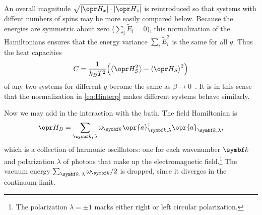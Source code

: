 \documentclass[../thesis.tex]{subfiles}
\begin{document}
An overall magnitude $\sqrt{\abs{\ham_x}\cdot\abs{\ham_z}}$ is reintroduced so
that systems with diffent numbers of spins may be more easily compared below.
Because the energies are symmetric about zero ($\sum_i \tilde{E}_i = 0$), this
normalization of the Hamiltonians ensures that the energy variance $\sum_i
\tilde{E}_i^2$ is the same for all $g$. Thus the heat capacities
\begin{equation}
  C
  = \frac{1}{k_B T^2}\qty(\ev{\ham_S^2} - \ev{\ham_S}^2)
\end{equation}
of any two systems for different $g$ become the same as $\beta \to
0$~\cite[p.~112]{kardarStatisticalPhysicsParticles2007}. It is in this sense
that the normalization in \cref{eq:Hinterp} makes different systems behave
similarly.

Now we may add in the interaction with the bath. The field Hamiltonian is
\begin{equation}
  \ham_B
  = \sum_{\vq{k},\, \lambda} \omega_{\vq{k}}
  \opr{a}^\dag_{\vq{k},\lambda}\opr{a}_{\vq{k},\lambda},
  \label{eq:bath-hamiltonian}
\end{equation}
which is a collection of harmonic oscillators: one for each wavenumber $\vq{k}$
and polarization $\lambda$ of photons that make up the electromagnetic
field.\footnote{%
  The polarization $\lambda = \pm 1$ marks either right or left circular
  polarization.
}
The vacuum energy $\sum_{\vq{k},\, \lambda} \omega_{\vq{k}} / 2$ is dropped,
since it diverges in the continuum limit.
\end{document}
